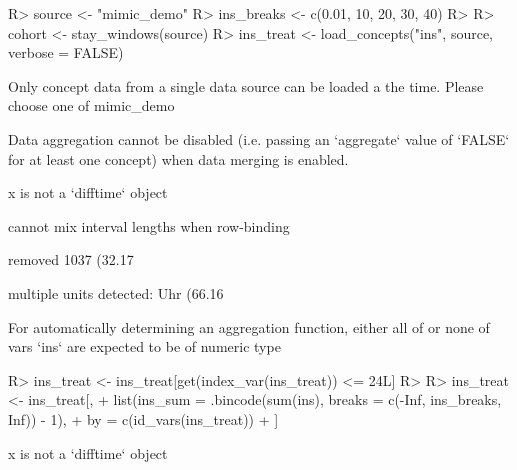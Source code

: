 \documentclass[
]{jss}
\begin{document}
\begin{CodeChunk}

\begin{CodeInput}
R> source <- "mimic_demo"
R> ins_breaks <- c(0.01, 10, 20, 30, 40)
R> 
R> cohort <- stay_windows(source)
R> ins_treat <- load_concepts("ins", source, verbose = FALSE)
\end{CodeInput}

\begin{CodeOutput}
Only concept data from a single data source can be loaded a the time. Please
choose one of mimic_demo
\end{CodeOutput}

\begin{CodeOutput}
Data aggregation cannot be disabled (i.e. passing an `aggregate` value of
`FALSE` for at least one concept) when data merging is enabled.
\end{CodeOutput}

\begin{CodeOutput}
x is not a `difftime` object
\end{CodeOutput}

\begin{CodeOutput}
cannot mix interval lengths when row-binding
\end{CodeOutput}

\begin{CodeOutput}
removed 1037 (32.17%
\end{CodeOutput}

\begin{CodeOutput}
multiple units detected: Uhr (66.16%
\end{CodeOutput}

\begin{CodeOutput}
For automatically determining an aggregation function, either all of or none of
vars `ins` are expected to be of numeric type
\end{CodeOutput}

\begin{CodeInput}
R> ins_treat <- ins_treat[get(index_var(ins_treat)) <= 24L]
R> 
R> ins_treat <- ins_treat[,
+   list(ins_sum = .bincode(sum(ins), breaks = c(-Inf, ins_breaks, Inf)) - 1),
+   by = c(id_vars(ins_treat))
+ ]
\end{CodeInput}

\begin{CodeOutput}
x is not a `difftime` object
\end{CodeOutput}


\end{CodeChunk}
\end{document}
